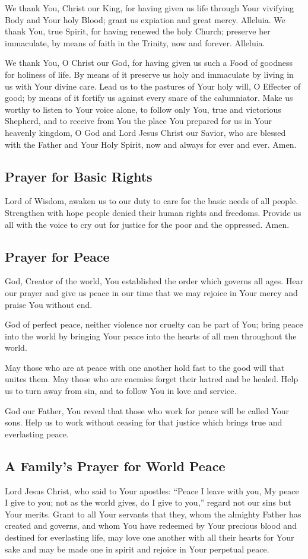 \documentclass[12pt]{article}
\newcommand{\prayertitle}[1]{\subsection{#1}}
\begin{document}
We thank You, Christ our King, for having given us life through Your vivifying Body
and Your holy Blood; grant us expiation and great mercy. Alleluia.
\newpage
We thank You, true Spirit, for having renewed the holy Church; preserve her immaculate, by means of faith in the Trinity, now and forever. Alleluia.

We thank You, O Christ our God, for having given us such a Food of goodness for
holiness of life.
By means of it preserve us holy and immaculate by living in us with Your divine care.
Lead us to the pastures of Your holy will, O Effecter of good; by means of it fortify us against every snare of the calumniator.
Make us worthy to listen to Your voice alone, to follow only You, true and victorious Shepherd, and to receive from You the place You prepared for us in Your heavenly kingdom, O God and Lord Jesus Christ our Savior, who are blessed with the Father and Your Holy Spirit, now and always for ever and ever.
Amen.

\prayertitle{Prayer for Basic Rights}
Lord of Wisdom, awaken us to our duty to care for the basic needs of all people.
Strengthen with hope people denied their human rights and freedoms.
Provide us all with the voice to cry out for justice for the poor and the oppressed.
Amen.

\prayertitle{Prayer for Peace}
God, Creator of the world, You established the order which governs all ages.
Hear our prayer and give us peace in our time that we may rejoice in Your mercy and praise You without end.

God of perfect peace, neither violence nor cruelty can be part of You;
bring peace into the world by bringing Your peace into the hearts of all men throughout the world.

May those who are at peace with one another hold fast to the good will that unites them.
May those who are enemies forget their hatred and be healed.
Help us to turn away from sin, and to follow You in love and service.

God our Father, You reveal that those who work for peace will be called Your sons.
Help us to work without ceasing for that justice which brings true and everlasting peace.

\prayertitle{A Family's Prayer for World Peace}
Lord Jesus Christ, who said to Your apostles:
``Peace I leave with you, My peace I give to you;
not as the world gives, do I give to you,''
regard not our sins but Your merits.
Grant to all Your servants that they, whom the almighty Father has created and governs, and whom You have redeemed by Your precious blood and destined for everlasting life, may love one another with all their hearts for Your sake and may be made one in spirit and rejoice in Your perpetual peace.
\end{document}
